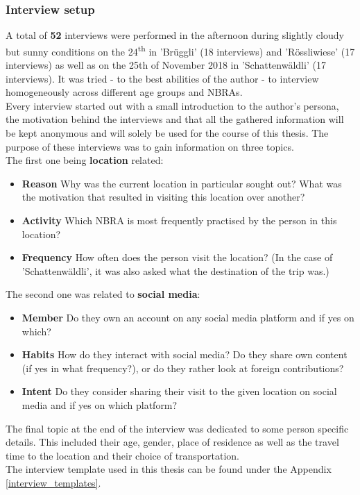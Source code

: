 \subsubsection{Interview setup} \label{interview_setup}
A total of \textbf{52} interviews were performed in the afternoon during slightly cloudy but sunny conditions on the 24\textsuperscript{th} in 'Br\"uggli' (18 interviews) and 'R\"ossliwiese' (17 interviews) as well as on the 25th of November 2018 in 'Schattenw\"aldli' (17 interviews). It was tried - to the best abilities of the author - to interview homogeneously across different age groups and NBRAs.\\
Every interview started out with a small introduction to the author's persona, the motivation behind the interviews and that all the gathered information will be kept anonymous and will solely be used for the course of this thesis. The purpose of these interviews was to gain information on three topics.\\
\newline
The first one being \textbf{location} related:
\begin{itemize}[label={}]
    \item \textbf{Reason} Why was the current location in particular sought out? What was the motivation that resulted in visiting this location over another?
    \item \textbf{Activity} Which NBRA is most frequently practised by the person in this location?
    \item \textbf{Frequency} How often does the person visit the location? (In the case of 'Schattenw\"aldli', it was also asked what the destination of the trip was.)
\end{itemize}

The second one was related to \textbf{social media}:
\begin{itemize}[label={}]
    \item \textbf{Member} Do they own an account on any social media platform and if yes on which?
    \item \textbf{Habits} How do they interact with social media? Do they share own content (if yes in what frequency?), or do they rather look at foreign contributions?
    \item \textbf{Intent} Do they consider sharing their visit to the given location on social media and if yes on which platform?
\end{itemize}
The final topic at the end of the interview was dedicated to some person specific details. This included their age, gender, place of residence as well as the travel time to the location and their choice of transportation.\\
The interview template used in this thesis can be found under the Appendix \ref{interview_templates}.
















